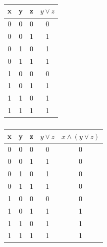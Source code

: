 \documentclass[svgnames,11pt]{beamer}
\begin{document}
\begin{frame}
    \frametitle{}

    \begin{center}
        \begin{tabular}{|c|c|c|c|}
            \hline
            x & y & z & $y \lor z$ \\
            \hline
            0 & 0 & 0 & 0                  \\
            \hline
            0 & 0 & 1 & 1                 \\
            \hline
            0 & 1 & 0 & 1                  \\
            \hline
            0 & 1 & 1 & 1                 \\
            \hline
            1 & 0 & 0 & 0                  \\
            \hline
            1 & 0 & 1 & 1                 \\
            \hline
            1 & 1 & 0 & 1                 \\
            \hline
            1 & 1 & 1 & 1                  \\
            \hline
        \end{tabular}
    \end{center}


\end{frame}
\begin{frame}
    \frametitle{}

    \begin{center}
        \begin{tabular}{|c|c|c|c|c|}
            \hline
            x & y & z & $y \lor z$&$x \land (y \lor z)$ \\
            \hline
            0 & 0 & 0 & 0 &0                 \\
            \hline
            0 & 0 & 1 & 1     &0            \\
            \hline
            0 & 1 & 0 & 1   &0               \\
            \hline
            0 & 1 & 1 & 1  &0               \\
            \hline
            1 & 0 & 0 & 0   &0               \\
            \hline
            1 & 0 & 1 & 1  &1               \\
            \hline
            1 & 1 & 0 & 1   &1              \\
            \hline
            1 & 1 & 1 & 1  &1                \\
            \hline
        \end{tabular}
    \end{center}


\end{frame}
\end{document}

